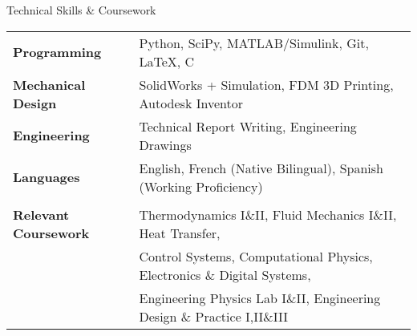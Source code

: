 \documentclass{resume} %
\begin{document}
\begin{rSection}{Technical Skills \& Coursework}
\begin{tabular}{ @{} >{\bfseries}l @{\hspace{6ex}} l }

Programming & Python, SciPy, MATLAB/Simulink, Git, \LaTeX, C\\
Mechanical Design & SolidWorks + Simulation, FDM 3D Printing, Autodesk Inventor\\
Engineering & Technical Report Writing, Engineering Drawings \\
Languages &  English, French (Native Bilingual), Spanish (Working Proficiency)\\
\\
Relevant Coursework & Thermodynamics I\&II, Fluid Mechanics I\&II, Heat Transfer,\\& Control Systems, Computational Physics, Electronics \& Digital Systems,\\&Engineering Physics Lab I\&II, Engineering Design \& Practice I,II\&III \\

\end{tabular}
\end{rSection}
\begin{comment}
\begin{rSection}{Projects}

\begin{rSubsection}{Co-Founder, PolyTwist Designs}{November 2015 - Present}{\url{www.polytwist.xyz}}{}
\item Co-founded a small business designing and manufacturing original Rubik's-Cube-style puzzles with unique mechanisms and functionsusing FDM 3D Printing and SolidWorks
\item Made over \$20,000 in sales of 16+ products at live events and through our online shop over three years
\item Officially partnered with Rubik's Brand Ltd. to mass-produce a product, involving the design stages to manufacturing through injection molding and packaging design
\item Responsible for the in-house production line from start to finish, product design, website development and upkeep, and sales through our online shop and in-person events.
\end{rSubsection}

\end{rSection}
\end{comment}
\end{document}
